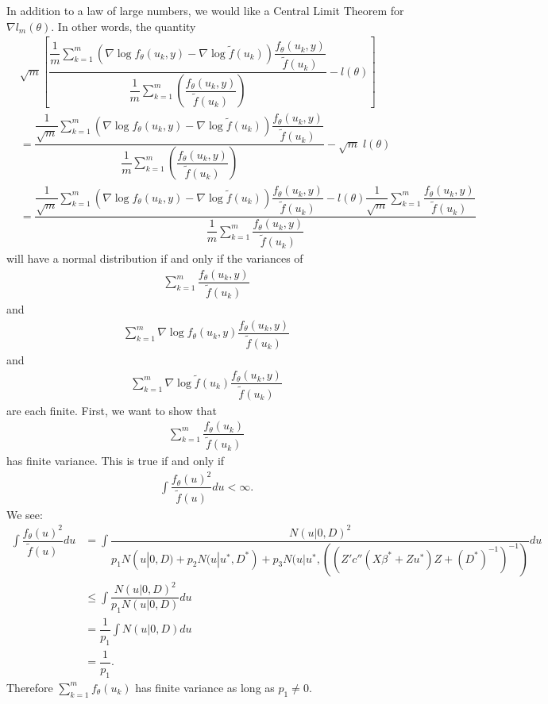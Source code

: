 \documentclass{article}
\begin{document}
In addition to a law of large numbers, we would like a Central Limit Theorem for $\nabla l_m(\theta)$. In other words, the quantity
\begin{align}
&\sqrt{m} \left[  \dfrac{\dfrac{1}{m}\sum_{k=1}^m    \left( \nabla \log f_\theta(u_k,y) - \nabla \log \tilde{f}(u_k) \right)  \dfrac{f_\theta(u_k,y)}{\tilde{f}(u_k)} }{\dfrac{1}{m} \sum_{k=1}^m \left( \dfrac{f_\theta(u_k,y)}{\tilde{f}(u_k)} \right) }- l(\theta)  \right] \\
&=
\dfrac{\dfrac{1}{\sqrt{m}}\sum_{k=1}^m    \left( \nabla \log f_\theta(u_k,y)  - \nabla \log \tilde{f}(u_k) \right) \dfrac{f_\theta(u_k,y)}{\tilde{f}(u_k)} }{\dfrac{1}{m} \sum_{k=1}^m \left( \dfrac{f_\theta(u_k,y)}{\tilde{f}(u_k)} \right) }- \sqrt{m}\;  l(\theta)  \\
&=\dfrac{\dfrac{1}{\sqrt{m}}\sum_{k=1}^m    \left( \nabla \log f_\theta(u_k,y) - \nabla \log \tilde{f}(u_k) \right) \dfrac{f_\theta(u_k,y)}{\tilde{f}(u_k)} 
 - l(\theta) \dfrac{1}{\sqrt{m}}\sum_{k=1}^m  \dfrac{f_\theta(u_k,y)}{\tilde{f}(u_k)} }{\dfrac{1}{m} \sum_{k=1}^m  \dfrac{f_\theta(u_k,y)}{\tilde{f}(u_k)} }   
\end{align}
will have a normal distribution if and only if the variances of
\begin{align}
\sum_{k=1}^m  \dfrac{f_\theta(u_k,y)}{\tilde{f}(u_k)}
\end{align}
and
\begin{align}
\sum_{k=1}^m     \nabla \log f_\theta(u_k,y)\dfrac{f_\theta(u_k,y)}{\tilde{f}(u_k)} 
\end{align}
and
\begin{align}
\sum_{k=1}^m     \nabla \log \tilde{f}(u_k)\dfrac{f_\theta(u_k,y)}{\tilde{f}(u_k)} 
\end{align}
are each finite.
First, we want to show that
\begin{align}
\sum_{k=1}^m \dfrac{f_\theta(u_k)}{\tilde{f}(u_k)}
\end{align}
has finite variance. This is true if and only if 
\begin{align}
\int \dfrac{f_\theta(u)^2}{\tilde{f}(u)} du < \infty.
\end{align}
We see:
\begin{align}
\int \dfrac{f_\theta(u)^2}{\tilde{f}(u)} du &= \int \dfrac{N(u|0,D)^2}{p_1 N(u|0,D)+p_2 N(u|u^*, D^*) + p_3 N(u|u^*, ((Z'  c''(X \beta^*+Zu^*) Z +(D^*)^{-1}   )^{-1})} du \\
& \leq \int \dfrac{N(u|0,D)^2}{p_1 N(u|0,D)} du \\
&= \dfrac{1}{p_1} \int N(u|0,D) du \\
&= \dfrac{1}{p_1}.
\end{align}
Therefore $\sum_{k=1}^m f_\theta(u_k)$ has finite variance as long as $p_1\neq 0$.
\end{document}
